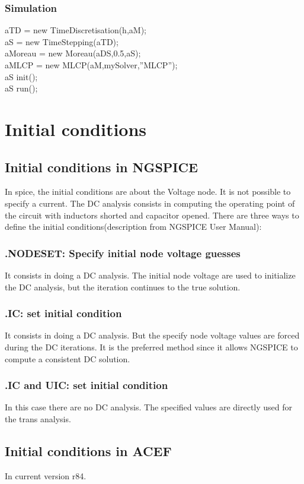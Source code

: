 \subsubsection{Simulation}
aTD = new TimeDiscretisation(h,aM);\\
aS = new TimeStepping(aTD);\\
aMoreau = new Moreau(aDS,0.5,aS);\\
aMLCP = new MLCP(aM,mySolver,''MLCP'');\\
aS init();\\
aS run();\\
\newpage

\section{Initial conditions}
\subsection{Initial conditions in NGSPICE}
In spice, the initial conditions are about the Voltage node. It is not possible to specify a
current. The DC analysis consists in computing the operating point of the circuit with inductors
shorted and capacitor opened. There are three ways to define the initial conditions(description from NGSPICE User Manual):

\subsubsection{.NODESET: Specify initial node voltage guesses}
It consists in doing a DC analysis. The initial node voltage are used to initialize the DC analysis,
but the iteration continues to the true solution.
\subsubsection{.IC: set initial condition }
It consists in doing a DC analysis. But the specify node voltage values are forced during the DC
iterations. It is the preferred method since it allows NGSPICE to compute a consistent DC solution.
\subsubsection{.IC and UIC: set initial condition }
In this case there are no DC analysis. The specified values are directly used for the trans
analysis.

\subsection{Initial conditions in ACEF}
In current version r84.\\
